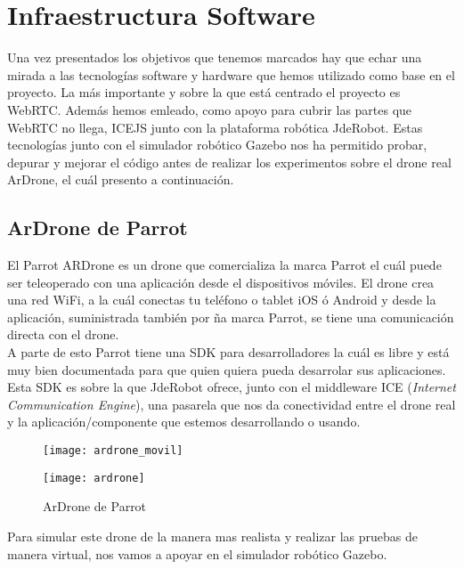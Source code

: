 \chapter{Infraestructura Software} 

Una vez presentados los objetivos que tenemos marcados hay que echar una mirada a las tecnologías software y hardware que hemos utilizado como base en el proyecto. La más importante y sobre la que está centrado el proyecto es WebRTC. Además hemos emleado, como apoyo para cubrir las partes que WebRTC no llega, ICEJS junto con la plataforma robótica JdeRobot. Estas tecnologías junto con el simulador robótico Gazebo nos ha permitido probar, depurar y mejorar el código antes de realizar los experimentos sobre el drone real ArDrone, el cuál presento a continuación.


\section{ArDrone de Parrot}

El Parrot ARDrone es un drone que comercializa la marca Parrot el cuál puede ser teleoperado con una aplicación desde el dispositivos móviles. El drone crea una red WiFi, a la cuál conectas tu teléfono o tablet iOS ó Android y desde la aplicación, suministrada también por ña marca Parrot,  se tiene una comunicación directa con el drone.\\

A parte de esto Parrot tiene una SDK para desarrolladores la cuál es libre y está muy bien documentada para que quien quiera pueda desarrolar sus aplicaciones. Esta SDK es sobre la que JdeRobot ofrece, junto con el middleware ICE (\emph{Internet Communication Engine}), una pasarela que nos da conectividad entre el drone real y la aplicación/componente que estemos desarrollando o usando.

\begin{figure}[htb]
\centering
\texttt{[image: ardrone\_movil]}
\end{figure}

\begin{figure}[htb]
\centering
\texttt{[image: ardrone]}
\caption{ArDrone de Parrot}
\label{fig:ardrone}
\end{figure}

Para simular este drone de la manera mas realista y realizar las pruebas de manera virtual, nos vamos a apoyar en el simulador robótico Gazebo.


\newpage
